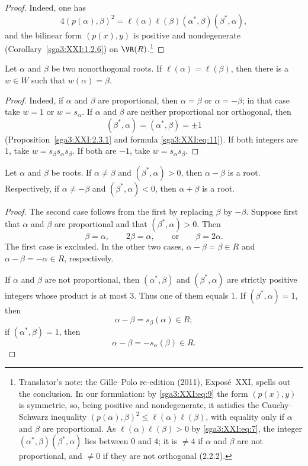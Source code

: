 \begin{proof}
Indeed, one has
\[
 4(p(\alpha),\beta)^2
 =\ell(\alpha)\ell(\beta)
   (\alpha^\ast,\beta)(\beta^\ast,\alpha),
\]
and the bilinear form \((p(x),y)\) is positive and nondegenerate
(Corollary~\ref{sga3:XXI:1.2.6}) on \(\VR(R)\).\footnote{Translator's note: the Gille--Polo re-edition (2011), Exposé~XXI, spells out
the conclusion. In our formulation: by \eqref{sga3:XXI:eq:9} the form \((p(x),y)\) is
symmetric, so, being positive and nondegenerate, it satisfies the Cauchy--Schwarz
inequality \((p(\alpha),\beta)^2\leq\ell(\alpha)\ell(\beta)\), with equality only if
\(\alpha\) and \(\beta\) are proportional. As \(\ell(\alpha)\ell(\beta)>0\) by
\eqref{sga3:XXI:eq:7}, the integer \((\alpha^\ast,\beta)(\beta^\ast,\alpha)\) lies
between \(0\) and \(4\); it is \(\neq4\) if \(\alpha\) and \(\beta\) are not
proportional, and \(\neq0\) if they are not orthogonal (2.2.2).}
\end{proof}

\begin{corollary}\label{sga3:XXI:2.3.2}
Let \(\alpha\) and \(\beta\) be two nonorthogonal roots. If
\(\ell(\alpha)=\ell(\beta)\), then there is a \(w\in W\) such that
\(w(\alpha)=\beta\).
\end{corollary}

\begin{proof}
Indeed, if \(\alpha\) and \(\beta\) are proportional, then
\(\alpha=\beta\) or \(\alpha=-\beta\); in that case take
\(w=1\) or \(w=s_\alpha\). If \(\alpha\) and \(\beta\) are neither
proportional nor orthogonal, then
\[
 (\beta^\ast,\alpha)=(\alpha^\ast,\beta)=\pm1
\]
(Proposition~\ref{sga3:XXI:2.3.1} and formula \eqref{sga3:XXI:eq:11}).
If both integers are \(1\), take \(w=s_\beta s_\alpha s_\beta\). If
both are \(-1\), take \(w=s_\alpha s_\beta\).
\end{proof}

\begin{corollary}\label{sga3:XXI:2.3.3}
Let \(\alpha\) and \(\beta\) be roots. If
\(\alpha\neq\beta\) and \((\beta^\ast,\alpha)>0\), then
\(\alpha-\beta\) is a root. Respectively, if
\(\alpha\neq-\beta\) and \((\beta^\ast,\alpha)<0\), then
\(\alpha+\beta\) is a root.
\end{corollary}

\begin{proof}
The second case follows from the first by replacing \(\beta\) by
\(-\beta\). Suppose first that \(\alpha\) and \(\beta\) are
proportional and that \((\beta^\ast,\alpha)>0\). Then
\[
 \beta=\alpha,\qquad 2\beta=\alpha,\qquad\text{or}\qquad
 \beta=2\alpha.
\]
The first case is excluded. In the other two cases,
\(\alpha-\beta=\beta\in R\) and
\(\alpha-\beta=-\alpha\in R\), respectively.

If \(\alpha\) and \(\beta\) are not proportional, then
\((\alpha^\ast,\beta)\) and \((\beta^\ast,\alpha)\) are strictly
positive integers whose product is at most \(3\). Thus one of them
equals \(1\). If \((\beta^\ast,\alpha)=1\), then
\[
 \alpha-\beta=s_\beta(\alpha)\in R;
\]
if \((\alpha^\ast,\beta)=1\), then
\[
 \alpha-\beta=-s_\alpha(\beta)\in R.
\]
\end{proof}

